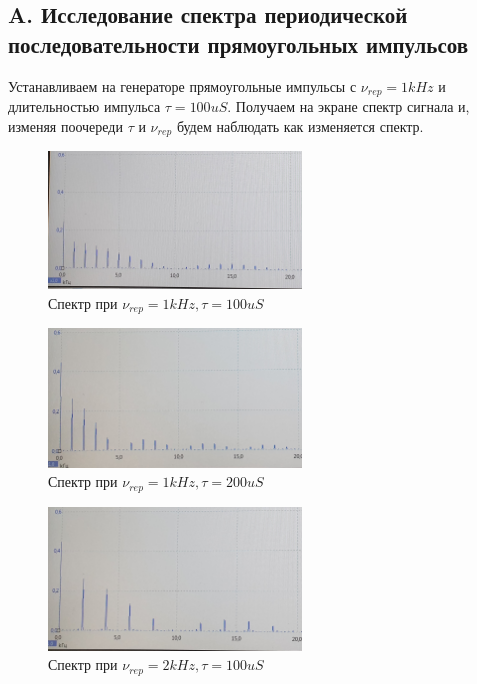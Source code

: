 \documentclass{article}
\begin{document}
\subsection{A. Исследование спектра периодической последовательности прямоугольных импульсов}

Устанавливаем на генераторе прямоугольные импульсы с \( \nu_{rep} = 1kHz \) и длительностью импульса
\( \tau = 100uS \). Получаем на экране спектр сигнала и, изменяя поочереди $\tau$ и $\nu_{rep}$ будем
наблюдать как изменяется спектр.

\begin{figure}[H]
    \centering
    \includegraphics[width=0.6\textwidth]{1.jpg}
    \caption{Спектр при \( \nu_{rep} = 1 kHz, \tau = 100uS \)}
    \label{spec_1}
\end{figure}

\begin{figure}[H]
    \centering
    \includegraphics[width=0.6\textwidth]{2.jpg}
    \caption{Спектр при \( \nu_{rep} = 1 kHz, \tau = 200uS \)} 
    \label{spec_2}
\end{figure}

\begin{figure}[H]
    \centering
    \includegraphics[width=0.6\textwidth]{3.jpg}
    \caption{Спектр при \( \nu_{rep} = 2 kHz, \tau = 100uS \)} 
    \label{spec_3}
\end{figure}
\end{document}
